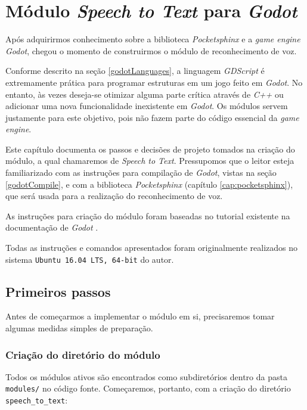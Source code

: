 \chapter{Módulo \textit{Speech to Text} para \textit{Godot}}
\label{cap:stt-module}

Após adquirirmos conhecimento sobre a biblioteca \textit{Pocketsphinx} e a \textit{game engine} \textit{Godot}, chegou o momento de construirmos o módulo de reconhecimento de voz.

Conforme descrito na seção \ref{godotLanguages}, a linguagem \textit{GDScript} é extremamente prática para programar estruturas em um jogo feito em \textit{Godot}. No entanto, às vezes deseja-se otimizar alguma parte crítica através de \textit{C++} ou adicionar uma nova funcionalidade inexistente em \textit{Godot}. Os módulos servem justamente para este objetivo, pois não fazem parte do código essencial da \textit{game engine}.

Este capítulo documenta os passos e decisões de projeto tomados na criação do módulo, a qual chamaremos de \textit{Speech to Text}. Pressupomos que o leitor esteja familiarizado com as instruções para compilação de \textit{Godot}, vistas na seção \ref{godotCompile}, e com a biblioteca \textit{Pocketsphinx} (capítulo \ref{cap:pocketsphinx}), que será usada para a realização do reconhecimento de voz.

As instruções para criação do módulo foram baseadas no tutorial existente na documentação de \textit{Godot} \citep{godotModuleCreation}.

Todas as instruções e comandos apresentados foram originalmente realizados no sistema \texttt{Ubuntu 16.04 LTS, 64-bit} do autor.


\section{Primeiros passos}

Antes de começarmos a implementar o módulo em si, precisaremos tomar algumas medidas simples de preparação.

\subsection{Criação do diretório do módulo}

Todos os módulos ativos são encontrados como subdiretórios dentro da pasta \texttt{modules/} no código fonte. Começaremos, portanto, com a criação do diretório \texttt{speech\_to\_text}:

